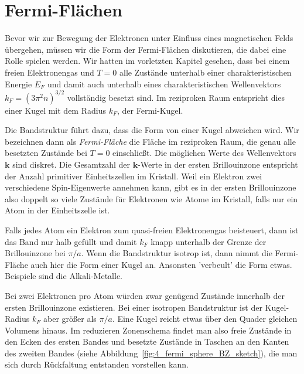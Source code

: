  






\section{Fermi-Flächen}


Bevor wir zur Bewegung der Elektronen unter Einfluss eines magnetischen Felds übergehen, müssen wir  die Form der Fermi-Flächen diskutieren, die dabei eine Rolle spielen werden. Wir hatten im vorletzten Kapitel gesehen, dass bei einem freien Elektronengas und $T=0$ alle Zustände unterhalb einer charakteristischen Energie $E_F$ und damit auch unterhalb eines charakteristischen Wellenvektors $k_F = (3 \pi^2 n)^{3/2}$ vollständig besetzt sind. Im reziproken Raum entspricht dies einer Kugel mit dem Radius $k_F$, der Fermi-Kugel.

Die Bandstruktur führt dazu, dass die Form von einer Kugel abweichen wird. Wir bezeichnen dann als \emph{Fermi-Fläche} die Fläche im reziproken Raum, die genau alle besetzten Zustände bei $T=0$ einschließt. Die möglichen Werte des Wellenvektors $\mathbf{k}$ sind diskret. Die Gesamtzahl der  $\mathbf{k}$-Werte in der ersten Brillouinzone entspricht der Anzahl primitiver Einheitszellen im Kristall. Weil ein Elektron zwei verschiedene Spin-Eigenwerte annehmen kann, gibt es in der ersten Brillouinzone also doppelt so viele Zustände für Elektronen wie Atome im Kristall, falls nur ein Atom in der Einheitszelle ist.

Falls jedes Atom ein Elektron zum quasi-freien Elektronengas beisteuert, dann ist das Band nur halb gefüllt und damit $k_F$ knapp  unterhalb der Grenze der Brillouinzone bei $\pi / a$. Wenn die Bandstruktur isotrop ist, dann nimmt die Fermi-Fläche auch hier die Form einer Kugel an. Ansonsten 'verbeult' die Form etwas. Beispiele sind die Alkali-Metalle.

Bei zwei Elektronen pro Atom würden zwar genügend Zustände innerhalb der ersten Brillouinzone existieren. Bei einer isotropen Bandstruktur ist der Kugel-Radius $k_F$ aber größer als $\pi /a$. Eine Kugel reicht etwas über den Quader gleichen Volumens hinaus. Im reduzieren Zonenschema findet man also freie Zustände in den Ecken des ersten Bandes und besetzte Zustände in Taschen an den Kanten des zweiten Bandes (siehe Abbildung~\ref{fig:4_fermi_sphere_BZ_sketch}), die man sich durch Rückfaltung entstanden vorstellen kann.

